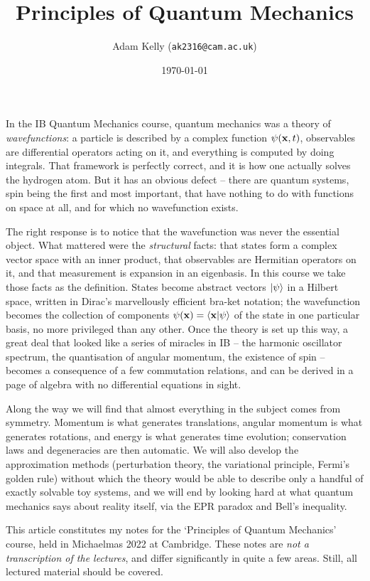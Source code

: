 \documentclass[a4paper]{scrartcl}
\title{Principles of Quantum Mechanics}
\author{Adam Kelly (\texttt{ak2316@cam.ac.uk})}
\date{\today}
\begin{document}
\maketitle

In the IB Quantum Mechanics course, quantum mechanics was a theory of \emph{wavefunctions}: a particle is described by a complex function $\psi(\mathbf{x}, t)$, observables are differential operators acting on it, and everything is computed by doing integrals. That framework is perfectly correct, and it is how one actually solves the hydrogen atom. But it has an obvious defect -- there are quantum systems, spin being the first and most important, that have nothing to do with functions on space at all, and for which no wavefunction exists.

The right response is to notice that the wavefunction was never the essential object. What mattered were the \emph{structural} facts: that states form a complex vector space with an inner product, that observables are Hermitian operators on it, and that measurement is expansion in an eigenbasis. In this course we take those facts as the definition. States become abstract vectors $\ket{\psi}$ in a Hilbert space, written in Dirac's marvellously efficient bra-ket notation; the wavefunction becomes the collection of components $\psi(\mathbf{x}) = \braket{\mathbf{x}}{\psi}$ of the state in one particular basis, no more privileged than any other. Once the theory is set up this way, a great deal that looked like a series of miracles in IB -- the harmonic oscillator spectrum, the quantisation of angular momentum, the existence of spin -- becomes a consequence of a few commutation relations, and can be derived in a page of algebra with no differential equations in sight.

Along the way we will find that almost everything in the subject comes from symmetry. Momentum is what generates translations, angular momentum is what generates rotations, and energy is what generates time evolution; conservation laws and degeneracies are then automatic. We will also develop the approximation methods (perturbation theory, the variational principle, Fermi's golden rule) without which the theory would be able to describe only a handful of exactly solvable toy systems, and we will end by looking hard at what quantum mechanics says about reality itself, via the EPR paradox and Bell's inequality.

This article constitutes my notes for the `Principles of Quantum Mechanics' course, held in Michaelmas 2022 at Cambridge. These notes are \emph{not a transcription of the lectures}, and differ significantly in quite a few areas. Still, all lectured material should be covered.
\end{document}
